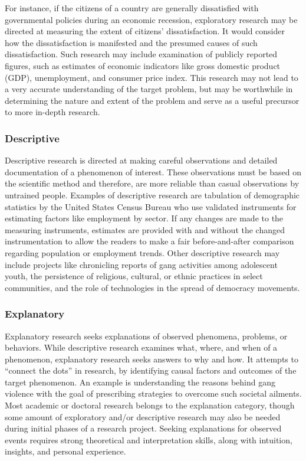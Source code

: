 \documentclass[]{book}
\theoremstyle{definition}
\theoremstyle{definition}
\theoremstyle{definition}
\theoremstyle{remark}
\begin{document}
For instance, if the citizens of a country are generally dissatisfied
with governmental policies during an economic recession, exploratory
research may be directed at measuring the extent of citizens'
dissatisfaction. It would consider how the dissatisfaction is manifested
and the presumed causes of such dissatisfaction. Such research may
include examination of publicly reported figures, such as estimates of
economic indicators like gross domestic product (GDP), unemployment, and
consumer price index. This research may not lead to a very accurate
understanding of the target problem, but may be worthwhile in
determining the nature and extent of the problem and serve as a useful
precursor to more in-depth research.

\hypertarget{descriptive}{%
\subsubsection{Descriptive}\label{descriptive}}

Descriptive research is directed at making careful observations and
detailed documentation of a phenomenon of interest. These observations
must be based on the scientific method and therefore, are more reliable
than casual observations by untrained people. Examples of descriptive
research are tabulation of demographic statistics by the United States
Census Bureau who use validated instruments for estimating factors like
employment by sector. If any changes are made to the measuring
instruments, estimates are provided with and without the changed
instrumentation to allow the readers to make a fair before-and-after
comparison regarding population or employment trends. Other descriptive
research may include projects like chronicling reports of gang
activities among adolescent youth, the persistence of religious,
cultural, or ethnic practices in select communities, and the role of
technologies in the spread of democracy movements.

\hypertarget{explanatory}{%
\subsubsection{Explanatory}\label{explanatory}}

Explanatory research seeks explanations of observed phenomena, problems,
or behaviors. While descriptive research examines what, where, and when
of a phenomenon, explanatory research seeks answers to why and how. It
attempts to ``connect the dots'' in research, by identifying causal
factors and outcomes of the target phenomenon. An example is
understanding the reasons behind gang violence with the goal of
prescribing strategies to overcome such societal ailments. Most academic
or doctoral research belongs to the explanation category, though some
amount of exploratory and/or descriptive research may also be needed
during initial phases of a research project. Seeking explanations for
observed events requires strong theoretical and interpretation skills,
along with intuition, insights, and personal experience.
\end{document}
